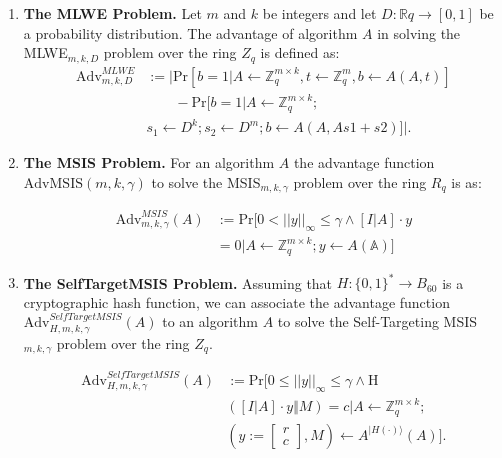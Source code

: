 \documentclass[5p,times]{elsarticle}
\theoremstyle{definition}
\theoremstyle{remark}
\numberwithin{equation}{section}
\begin{document}
\begin{enumerate}
    \item \textbf{The MLWE Problem.} Let $m$ and $k$ be integers and let $D: \mathbb{R}q \rightarrow [0, 1]$ be a probability distribution. The advantage of algorithm $A$ in solving the MLWE$_{m,k,D}$ problem over the ring $Z_q$ is defined as:
    \begin{align*}
        \mathrm{Adv}^{MLWE}_{m,k,D} 
        &:= 
         \vert \mathrm{Pr}
        [b=1 | A \gets \mathbb{Z}_q^{m \times k}, t \gets \mathbb{Z}_q^m, b \gets A(A,t)
        ] 
         \\
        & \qquad - 
        \mathrm{Pr}
        [b=1 | A \gets \mathbb{Z}_q^{m\times k};  \\
        & s_1 \gets D^k; s_2 \gets D^m; b \gets A(A,As1+s2)] \vert. 
    \end{align*}

    \item \textbf{The MSIS Problem.} For an algorithm $A$  the advantage function $\mathrm{AdvMSIS}(m,k,\gamma)$ to solve the MSIS$_{m,k,\gamma}$ problem over the ring $R_q$ is as:
    
    \begin{align*}
    \mathrm{Adv}^{MSIS}_{m,k,\gamma}(A) 
    & := \mathrm{Pr}
    [0 < ||y||_{\infty} 
    \leq \gamma \wedge [I \vert A] \cdot y  \\
    & = 0 | A \gets \mathbb{Z}_q^{m\times k};y \gets A(\mathbb{A})]
    \end{align*}

    \item \textbf{The SelfTargetMSIS Problem.} Assuming that $H : \{0, 1\}^* \rightarrow B_{60}$ is a cryptographic hash function, we can associate the advantage function $\mathrm{Adv}^{SelfTargetMSIS}_{H,m,k,\gamma}(A)$ to an algorithm $A$ to solve the Self-Targeting MSIS$_{m,k,\gamma}$ problem over the ring $Z_q$.

    \begin{align*}
    \mathrm{Adv}^{SelfTargetMSIS}_{H,m,k,\gamma}(A) 
    & := \mathrm{Pr}
    \bigl[0 \leq ||y||_{\infty} \leq \gamma \wedge \text{H} \\
    & ([I\vert A]\cdot y\Vert M) = c | A \gets \mathbb{Z}_q^{m\times k};\\
    &\left(y:= \begin{bmatrix} r \\ c \end{bmatrix},M\right) \gets A^{\vert H(\cdot)\rangle}(A)\bigr].
    \end{align*}
\end{enumerate}
\end{document}
